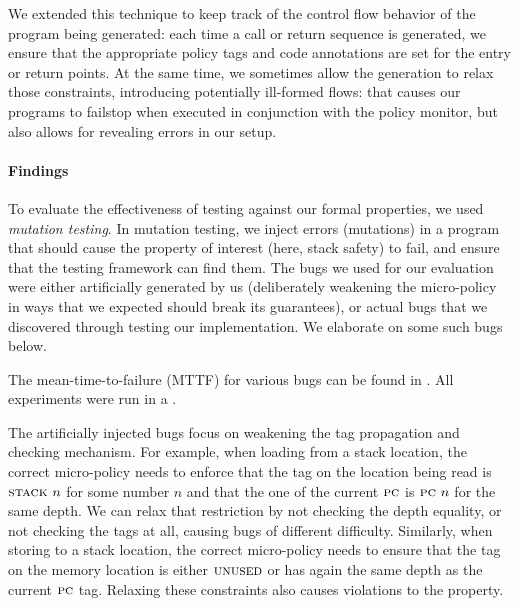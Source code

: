 \documentclass[acmsmall,review,anonymous]{acmart}\settopmatter{printfolios=true,printccs=false,printacmref=false}
\begin{document}
We extended this technique to keep track of the control flow behavior of
the program being generated: each time a call or return sequence is
generated, we ensure that the appropriate policy tags and code
annotations are set for the entry or return points. At the same time,
we sometimes allow the generation to relax those constraints,
introducing potentially ill-formed flows: that causes our programs
to failstop when executed in conjunction with the policy monitor,
but also allows for revealing errors in our setup.

\paragraph*{Findings}

To evaluate the effectiveness of testing against our formal properties, we
used {\em mutation testing}. In mutation testing, we inject errors
(mutations) in a program that should cause the property of interest (here,
stack safety) to fail, and ensure that the testing framework can find
them. The bugs we used for our evaluation were either artificially generated
by us (deliberately weakening the micro-policy in ways that we expected
should break its guarantees), or actual bugs that we discovered through
testing our implementation. We elaborate on some such bugs below.

The mean-time-to-failure (MTTF) for various bugs can be found in . All experiments were run in a . 

The artificially injected bugs focus on weakening the tag propagation
and checking mechanism. 
%
For example, when loading from a stack location, the correct
micro-policy needs to enforce that the tag on the location being read
is $\textsc{stack} ~ n$ for some number $n$ and that the one of the
current $\textsc{pc}$ is $\textsc{pc} ~ n$ for the same depth. We can relax
that restriction by not checking the depth equality, or not checking
the tags at all, causing bugs of different difficulty.
%
Similarly, when storing to a stack location, the correct micro-policy
needs to ensure that the tag on the memory location is either
$\textsc{unused}$ or has again the same depth as the current $\textsc{pc}$
tag. Relaxing these constraints also causes violations to the
property.
\end{document}
